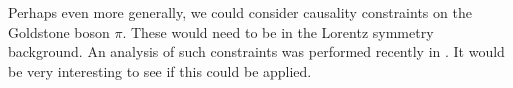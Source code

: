 \documentclass[11pt]{article}
\numberwithin{equation}{section}
\newcommand{\be}{\begin{equation}} \newcommand{\ee}{\end{equation}}
\newcommand{\bea}{\begin{eqnarray}}  \newcommand{\eea}{\end{eqnarray}}
\begin{document}
Perhaps even more generally, we could consider causality constraints on the Goldstone boson $\pi$. These would need to be in the Lorentz symmetry background. An analysis of such constraints was performed recently in \cite{Creminelli:2022onn}. It would be very interesting to see if this could be applied. 

%
%
%
\end{document}
